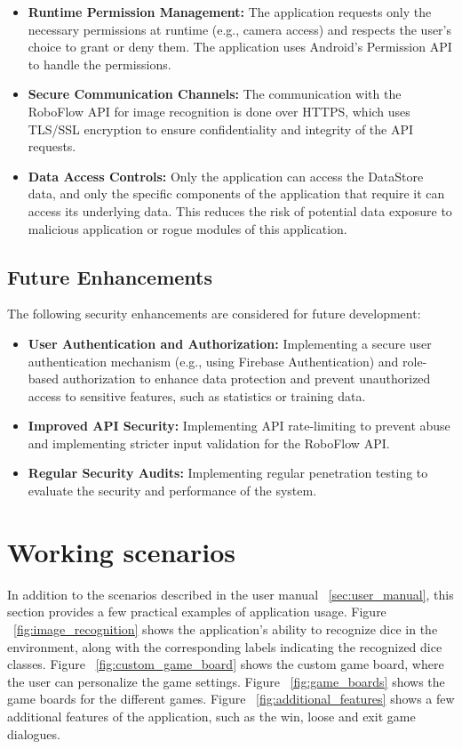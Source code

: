 \begin{itemize}
    \item \textbf{Runtime Permission Management:} The application requests only the necessary permissions at runtime (e.g., camera access) and respects the user's choice to grant or deny them. The application uses Android's Permission API to handle the permissions.
    \item \textbf{Secure Communication Channels:} The communication with the RoboFlow API for image recognition is done over HTTPS, which uses TLS/SSL encryption to ensure confidentiality and integrity of the API requests.
     \item \textbf{Data Access Controls:} Only the application can access the DataStore data, and only the specific components of the application that require it can access its underlying data. This reduces the risk of potential data exposure to malicious application or rogue modules of this application.
\end{itemize}

\subsection{Future Enhancements}

The following security enhancements are considered for future development:

\begin{itemize}
    \item \textbf{User Authentication and Authorization:}  Implementing a secure user authentication mechanism (e.g., using Firebase Authentication) and role-based authorization to enhance data protection and prevent unauthorized access to sensitive features, such as statistics or training data.
    \item \textbf{Improved API Security:} Implementing API rate-limiting to prevent abuse and implementing stricter input validation for the RoboFlow API.
     \item \textbf{Regular Security Audits:} Implementing regular penetration testing to evaluate the security and performance of the system.
\end{itemize}

\section{Working scenarios}

In addition to the scenarios described in the user manual ~\ref{sec:user_manual}, this section provides a few practical examples of application usage. Figure ~\ref{fig:image_recognition} shows the application’s ability to recognize dice in the environment, along with the corresponding labels indicating the recognized dice classes. Figure ~\ref{fig:custom_game_board} shows the custom game board, where the user can personalize the game settings. Figure ~\ref{fig:game_boards} shows the game boards for the different games. Figure ~\ref{fig:additional_features} shows a few additional features of the application, such as the win, loose and exit game dialogues.

